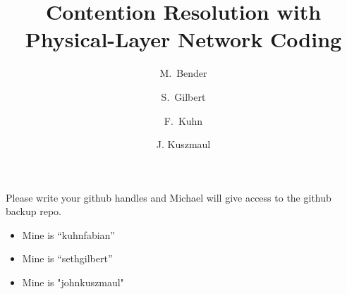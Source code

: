 \documentclass[11pt]{article}
\begin{document}
\title{Contention Resolution with Physical-Layer Network Coding}

\author{M.\ Bender \and S.\ Gilbert \and F.\ Kuhn \and J. Kuszmaul}
\maketitle

Please write your github handles and Michael will give access to the github backup repo.

\begin{itemize}
    \item Mine is ``kuhnfabian''
    \item Mine is ``sethgilbert''
    \item Mine is "johnkuszmaul"
\end{itemize}













\end{document}
